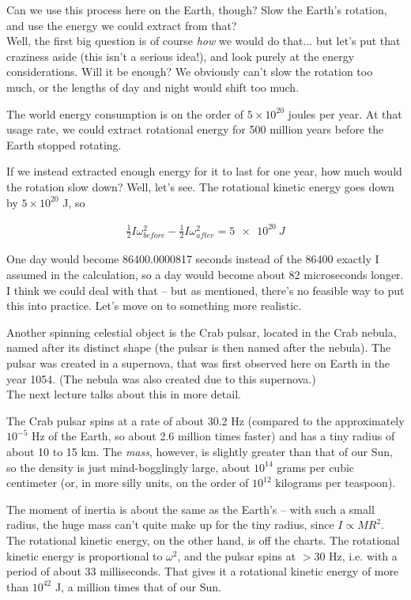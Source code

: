 \documentclass[8.01x]{subfiles}
\begin{document}
Can we use this process here on the Earth, though? Slow the Earth's rotation, and use the energy we could extract from that?\\
Well, the first big question is of course \emph{how} we would do that... but let's put that craziness aside (this isn't a serious idea!), and look purely at the energy considerations. Will it be enough? We obviously can't slow the rotation too much, or the lengths of day and night would shift too much.

The world energy consumption is on the order of $5 \times 10^{20}$ joules per year. At that usage rate, we could extract rotational energy for 500 million years before the Earth stopped rotating.

If we instead extracted enough energy for it to last for one year, how much would the rotation slow down? Well, let's see. The rotational kinetic energy goes down by $5 \times 10^{20}$ J, so

\begin{align}
\frac{1}{2} I \omega_{before}^2 - \frac{1}{2} I \omega_{after}^2 = \SI{5e20}{J}
\end{align}

One day would become 86400.0000817 seconds instead of the 86400 exactly I assumed in the calculation, so a day would become about 82 microseconds longer. I think we could deal with that -- but as mentioned, there's no feasible way to put this into practice. Let's move on to something more realistic.

Another spinning celestial object is the Crab pulsar, located in the Crab nebula, named after its distinct shape (the pulsar is then named after the nebula). The pulsar was created in a supernova, that was first observed here on Earth in the year 1054. (The nebula was also created due to this supernova.)\\
The next lecture talks about this in more detail.

The Crab pulsar spins at a rate of about 30.2 Hz (compared to the approximately $10^{-5}$ Hz of the Earth, so about 2.6 million times faster) and has a tiny radius of about 10 to 15 km. The \emph{mass}, however, is slightly greater than that of our Sun, so the density is just mind-bogglingly large, about $10^{14}$ grams per cubic centimeter (or, in more silly units, on the order of $10^{12}$ kilograms per teaspoon).

The moment of inertia is about the same as the Earth's -- with such a small radius, the huge mass can't quite make up for the tiny radius, since $I \propto M R^2$.\\
The rotational kinetic energy, on the other hand, is off the charts. The rotational kinetic energy is proportional to $\omega^2$, and the pulsar spins at $>30$ Hz, i.e. with a period of about 33 milliseconds. That gives it a rotational kinetic energy of more than $10^{42}$ J, a million times that of our Sun.
\end{document}
